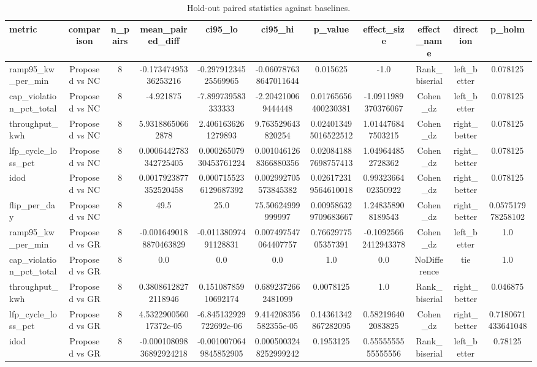 \begin{table}[t]
\centering
\caption{Hold-out paired statistics against baselines.}
\label{tab:holdout_stats_auto}
\begin{tabular}{lcccccccccc}
\toprule
metric & comparison & n\_pairs & mean\_paired\_diff & ci95\_lo & ci95\_hi & p\_value & effect\_size & effect\_name & direction & p\_holm \\
\midrule
ramp95\_kw\_per\_min & Proposed vs NC & 8 & -0.17347495336253216 & -0.29791234525569965 & -0.060787638647011644 & 0.015625 & -1.0 & Rank\_biserial & left\_better & 0.078125 \\
cap\_violation\_pct\_total & Proposed vs NC & 8 & -4.921875 & -7.899739583333333 & -2.204210069444448 & 0.01765656400230381 & -1.0911989370376067 & Cohen\_dz & left\_better & 0.078125 \\
throughput\_kwh & Proposed vs NC & 8 & 5.93188650662878 & 2.4061636261279893 & 9.763529643820254 & 0.024013495016522512 & 1.014476847503215 & Cohen\_dz & right\_better & 0.078125 \\
lfp\_cycle\_loss\_pct & Proposed vs NC & 8 & 0.0006442783342725405 & 0.00026507930453761224 & 0.0010461268366880356 & 0.020841887698757413 & 1.049644852728362 & Cohen\_dz & right\_better & 0.078125 \\
idod & Proposed vs NC & 8 & 0.0017923877352520458 & 0.0007155236129687392 & 0.002992705573845382 & 0.026172319564610018 & 0.9932366402350922 & Cohen\_dz & right\_better & 0.078125 \\
flip\_per\_day & Proposed vs NC & 8 & 49.5 & 25.0 & 75.50624999999997 & 0.009586329709683667 & 1.248358908189543 & Cohen\_dz & right\_better & 0.057517978258102 \\
ramp95\_kw\_per\_min & Proposed vs GR & 8 & -0.0016490188870463829 & -0.01138097491128831 & 0.007497547064407757 & 0.7662977505357391 & -0.10925662412943378 & Cohen\_dz & left\_better & 1.0 \\
cap\_violation\_pct\_total & Proposed vs GR & 8 & 0.0 & 0.0 & 0.0 & 1.0 & 0.0 & NoDifference & tie & 1.0 \\
throughput\_kwh & Proposed vs GR & 8 & 0.38086128272118946 & 0.15108785910692174 & 0.6892372662481099 & 0.0078125 & 1.0 & Rank\_biserial & right\_better & 0.046875 \\
lfp\_cycle\_loss\_pct & Proposed vs GR & 8 & 4.532290056017372e-05 & -6.845132929722692e-06 & 9.414208356582355e-05 & 0.14361342867282095 & 0.582196402083825 & Cohen\_dz & right\_better & 0.7180671433641048 \\
idod & Proposed vs GR & 8 & -0.00010809836892924218 & -0.0010070649845852905 & 0.0005003248252999242 & 0.1953125 & 0.5555555555555556 & Rank\_biserial & left\_better & 0.78125 \\

\end{tabular}
\end{table}
